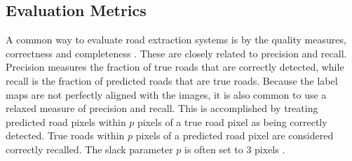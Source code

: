 \subsection{Evaluation Metrics}
A common way to evaluate road extraction systems is by the quality measures,  correctness and completeness \citep{Wiedemann_road_evaluation}. These are closely related to precision and recall. Precision measures the fraction of true roads that are correctly detected, while recall is the fraction of predicted roads that are true roads. Because the label maps are not perfectly aligned with the images, it is also common to use a relaxed measure of precision and recall. This is accomplished by treating predicted road pixels within $p$ pixels of a true road pixel as being correctly detected. True roads within $p$ pixels of a predicted road pixel are considered correctly recalled. The slack parameter $p$ is often set to 3 pixels \citep{Mnih_roads_high_res_aerial_images}.


